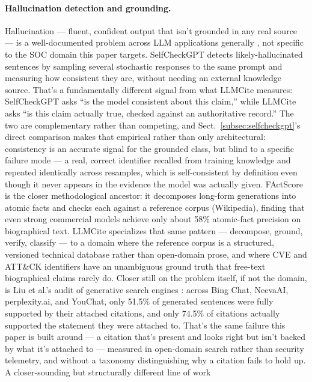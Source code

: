 \documentclass[pdflatex,sn-mathphys-num]{sn-jnl}%
\begin{document}
\paragraph{Hallucination detection and grounding.} Hallucination ---
fluent, confident output that isn't grounded in any real source --- is a
well-documented problem across LLM applications generally
\cite{hallucinationsurvey2024}, not specific to the SOC domain this paper
targets. SelfCheckGPT \cite{selfcheckgpt2023} detects likely-hallucinated
sentences by sampling several stochastic responses to the same prompt
and measuring how consistent they are, without needing an external
knowledge source. That's a fundamentally different signal from what
LLMCite measures: SelfCheckGPT asks ``is the model consistent about this
claim,'' while LLMCite asks ``is this claim actually true, checked
against an authoritative record.'' The two are complementary rather than
competing, and Sect.~\ref{subsec:selfcheckgpt}'s direct comparison makes
that empirical rather than only architectural: consistency is an
accurate signal for the grounded class, but blind to a specific failure
mode --- a real, correct identifier recalled from training knowledge and
repeated identically across resamples, which is self-consistent by
definition even though it never appears in the evidence the model was
actually given. FActScore \cite{factscore2023} is the closer
methodological ancestor: it decomposes long-form generations into
atomic facts and checks each against a reference corpus (Wikipedia),
finding that even strong commercial models achieve only about 58\%
atomic-fact precision on biographical text. LLMCite specializes that
same pattern --- decompose, ground, verify, classify --- to a domain
where the reference corpus is a structured, versioned technical database
rather than open-domain prose, and where CVE and ATT\&CK identifiers
have an unambiguous ground truth that free-text biographical claims
rarely do. Closer still on the problem itself, if not the domain, is Liu
et al.'s audit of generative search engines \cite{liuverifiability2023}:
across Bing Chat, NeevaAI, perplexity.ai, and YouChat, only 51.5\% of
generated sentences were fully supported by their attached citations,
and only 74.5\% of citations actually supported the statement they were
attached to. That's the same failure this paper is built around --- a
citation that's present and looks right but isn't backed by what it's
attached to --- measured in open-domain search rather than security
telemetry, and without a taxonomy distinguishing why a citation fails to
hold up. A closer-sounding but structurally different line of work
\end{document}
